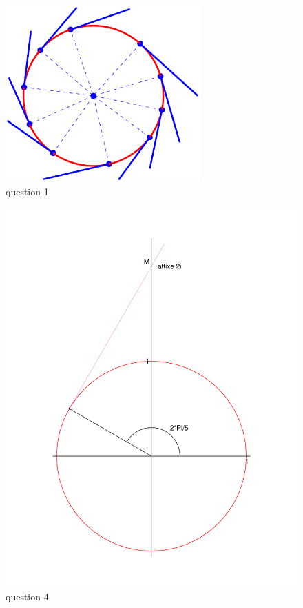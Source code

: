 \begin{figure}
   \centering
   \includegraphics[width=7.5cm]{Cfamd_1.pdf}
   \caption{question 1}
\end{figure}
\begin{figure}
   \centering
   \includegraphics[scale=0.25]{Cfamd_2.pdf}
   \caption{question 4}
\end{figure}
